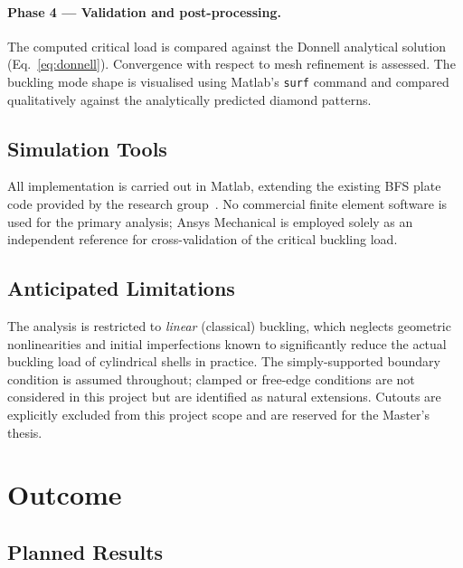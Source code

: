 \documentclass[9pt,a4paper,twoside]{tau-class/tau}
\begin{document}
\paragraph{Phase 4 --- Validation and post-processing.}
The computed critical load is compared against the Donnell analytical
solution (Eq.~\eqref{eq:donnell}). Convergence with respect to mesh
refinement is assessed. The buckling mode shape is visualised using
Matlab's \texttt{surf} command and compared qualitatively against the
analytically predicted diamond patterns.

\subsection{Simulation Tools}

All implementation is carried out in Matlab, extending the existing BFS
plate code provided by the research group~\cite{eisentraeger2022}. No
commercial finite element software is used for the primary analysis; Ansys
Mechanical is employed solely as an independent reference for
cross-validation of the critical buckling load.

\subsection{Anticipated Limitations}

The analysis is restricted to \emph{linear} (classical) buckling, which
neglects geometric nonlinearities and initial imperfections known to
significantly reduce the actual buckling load of cylindrical shells in
practice. The simply-supported boundary condition is assumed throughout;
clamped or free-edge conditions are not considered in this project but are
identified as natural extensions. Cutouts are explicitly excluded from this
project scope and are reserved for the Master's thesis.

\section{Outcome}

\subsection{Planned Results}
\end{document}
